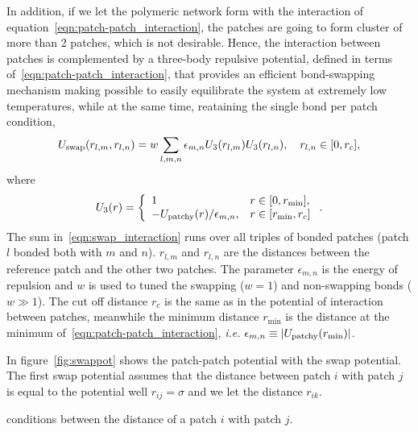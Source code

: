 In addition, if we let the polymeric network form with the interaction of equation~\eqref{eqn:patch-patch_interaction}, the patches are going to form cluster of more than 2 patches, which is not desirable.
Hence, the interaction between patches is complemented by a three-body repulsive potential, defined in terms of~\eqref{eqn:patch-patch_interaction}, that provides an efficient bond-swapping mechanism making possible to easily equilibrate the system at extremely low temperatures, while at the same time, reataining the single bond per patch condition\citep{sciortinoThreebodyPotentialSimulating2017},
\begin{gather}
    U_{\mathrm{swap}}(r_{l,m},r_{l,n}) = w\sum_{l,m,n}\epsilon_{m,n}U_3\qty(r_{l,m})U_3\qty(r_{l,n}),\quad r_{l,n}\in\qty[0,r_c],\label{eqn:swap_interaction}
\end{gather}
where
\begin{gather}
    U_{3}\qty(r) = \left\{
        \begin{array}{ll}
            1 & r\in\qty[0,r_{\min}], \\
            -U_{\mathrm{patchy}}\qty(r)/\epsilon_{m,n}, & r\in\qty[r_{\min},r_c]
        \end{array}
        \right.\label{eqn:swapmod_interaction}.
\end{gather}
The sum in~\eqref{eqn:swap_interaction} runs over all triples of bonded patches (patch $l$ bonded both with $m$ and $n$).
$r_{l,m}$ and $r_{l,n}$ are the distances between the reference patch and the other two patches.
The parameter $\epsilon_{m,n}$ is the energy of repulsion and $w$ is used to tuned the swapping ($w=1$) and non-swapping bonds ($w\gg1$). 
The cut off distance $r_c$ is the same as in the potential of interaction between patches, meanwhile the minimum distance $r_{\min}$ is the distance at the minimum of~\eqref{eqn:patch-patch_interaction}, \textit{i.e.} $\epsilon_{m,n}\equiv\abs{U_{\mathrm{patchy}}(r_{\min})}$.

In figure~\ref{fig:swappot} shows the patch-patch potential with the swap potential.
The first swap potential assumes that the distance between patch $i$ with patch $j$ is equal to the potential well $r_{ij}=\sigma$ and we let the distance $r_{ik}$.

conditions between the distance of a patch $i$ with patch $j$.



